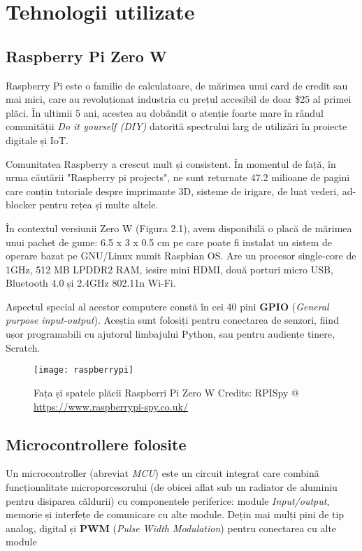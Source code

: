 \chapter{Tehnologii utilizate}


\section{Raspberry Pi Zero W}

Raspberry Pi este o familie de calculatoare, de mărimea unui card de credit sau mai mici, care au revoluționat industria cu prețul accesibil de doar \$25 al primei plăci. În ultimii 5 ani, acestea au dobândit o atenție foarte mare în rândul comunității \emph{Do it yourself (DIY)} datorită spectrului larg de utilizări în proiecte digitale și IoT.

Comunitatea Raspberry a crescut mult și consistent. În momentul de față, în urma căutării "Raspberry pi projects", ne sunt returnate 47.2 milioane de pagini care conțin tutoriale despre imprimante 3D, sisteme de irigare, de luat vederi, ad-blocker pentru rețea și multe altele.

În contextul versiunii Zero W (Figura 2.1), avem disponibilă o placă de mărimea unui pachet de gume: 6.5 x 3 x 0.5 cm pe care poate fi instalat un sistem de operare bazat pe GNU/Linux numit Raspbian OS. Are un procesor single-core de 1GHz, 512 MB LPDDR2 RAM, iesire mini HDMI, două porturi micro USB, Bluetooth 4.0 și 2.4GHz 802.11n Wi-Fi.

Aspectul special al acestor computere constă în cei 40 pini \textbf{GPIO} (\emph{General purpose input-output}). Aceștia sunt folosiți pentru conectarea de senzori, fiind ușor programabili cu ajutorul limbajului Python, sau pentru audiențe tinere, Scratch.


\begin{figure}[h]
	\centering
	\texttt{[image: raspberrypi]}
	\caption{Fața și spatele plăcii Raspberri Pi Zero W
		Credits: RPISpy @ \url{https://www.raspberrypi-spy.co.uk/}}
	\label{fig:raspberrypi}
\end{figure}

\break

\section{Microcontrollere folosite}

Un microcontroller (abreviat \emph{MCU}) este un circuit integrat care combină funcționalitate microporcesorului (de obicei aflat sub un radiator de aluminiu pentru disiparea căldurii) cu componentele periferice: module \emph{Input/output}, memorie și interfețe de comunicare cu alte module. Dețin mai mulți pini de tip analog, digital și \textbf{PWM} (\emph{Pulse Width Modulation}) pentru conectarea cu alte module

